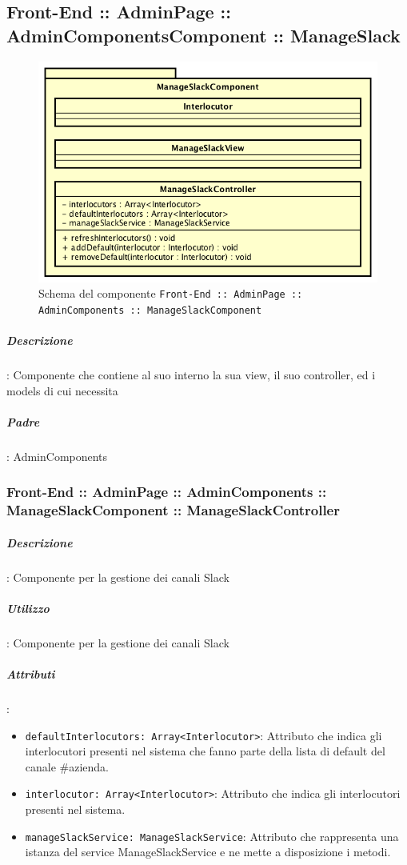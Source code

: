 \documentclass[../ManualeSviluppatore_v2.0.0.tex]{subfiles}
\begin{document}
	\subsection{Front-End :: AdminPage :: AdminComponentsComponent :: ManageSlack}
	\begin{figure}[!h]
		\centering
		\includegraphics[scale=0.6]{Architettura/Front-End/AdminPage/AdminComponents/ManageSlackComponent.png}
		\caption{Schema del componente \texttt{Front-End :: AdminPage :: AdminComponents :: ManageSlackComponent}}
	\end{figure}
			\subparagraph{Descrizione}: Componente che contiene al suo interno la sua view, il suo controller, ed i models di cui necessita
			\subparagraph{Padre}: AdminComponents
			      \subsubsection{Front-End :: AdminPage :: AdminComponents :: ManageSlackComponent :: ManageSlackController}
			      	\subparagraph{Descrizione}: Componente per la gestione dei canali Slack
			      	\subparagraph{Utilizzo}: Componente per la gestione dei canali Slack
			      	\subparagraph{Attributi}:
					\begin{itemize}
						\item \texttt{defaultInterlocutors: Array<Interlocutor>}: Attributo che indica gli interlocutori presenti nel sistema che fanno parte della lista di default del canale \#azienda.
						\item \texttt{interlocutor: Array<Interlocutor>}: Attributo che indica gli interlocutori presenti nel sistema.
						\item \texttt{manageSlackService: ManageSlackService}: Attributo che rappresenta una istanza del service ManageSlackService e ne mette a disposizione i metodi.
					\end{itemize}
\end{document}

